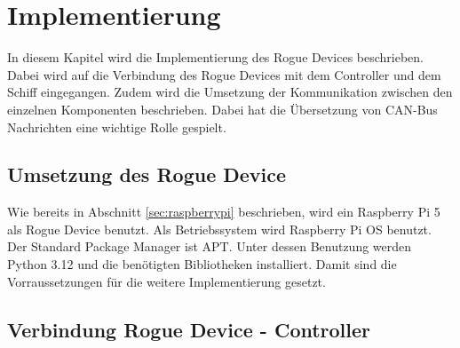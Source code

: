 \chapter{Implementierung}

In diesem Kapitel wird die Implementierung des Rogue Devices beschrieben. Dabei wird auf die Verbindung des Rogue Devices
mit dem Controller und dem Schiff eingegangen. Zudem wird die Umsetzung der Kommunikation zwischen den einzelnen Komponenten
beschrieben. Dabei hat die Übersetzung von CAN-Bus Nachrichten eine wichtige Rolle gespielt.

\section{Umsetzung des Rogue Device}
Wie bereits in Abschnitt \ref{sec:raspberrypi} beschrieben, wird ein Raspberry Pi 5 als Rogue Device benutzt. 
Als Betriebssystem wird Raspberry Pi OS benutzt. Der Standard Package Manager ist APT. Unter dessen Benutzung werden 
Python 3.12 und die benötigten Bibliotheken installiert. Damit sind die Vorraussetzungen für die weitere Implementierung
gesetzt.

\section{Verbindung Rogue Device - Controller} 

